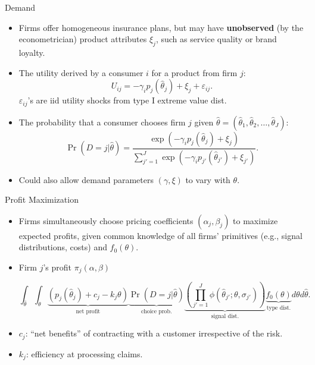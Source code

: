 \documentclass[10pt,aspectratio=169]{beamer}
\begin{document}
\begin{frame}{Demand}
    \begin{itemize}
        \item Firms offer homogeneous insurance plans, but may have \textbf{unobserved} (by the econometrician) product attributes $\xi_j$, such as service quality or brand loyalty.
        
        \medskip
        \item The utility derived by a consumer $i$ for a product from firm $j$:
        \[ U_{ij} = -\gamma_i p_j(\hat{\theta}_j) + \xi_j + \varepsilon_{ij}. \]
        $\varepsilon_{ij}$'s are iid utility shocks from type I extreme value dist.
        
        \medskip
        \item The probability that a consumer chooses firm $j$ given $\hat{\theta} = (\hat{\theta}_1, \hat{\theta}_2, \dots, \hat{\theta}_J)$:
        \[ \Pr(D=j|\hat{\theta}) = \frac{\exp(-\gamma_i p_j(\hat{\theta}_j) + \xi_j)}{\sum_{j'=1}^{J} \exp(-\gamma_i p_{j'}(\hat{\theta}_{j'}) + \xi_{j'})}. \]
        
        \medskip
        \item Could also allow demand parameters $(\gamma, \xi)$ to vary with $\theta$.
    \end{itemize}
\end{frame}

\begin{frame}{Profit Maximization}
    \begin{itemize}
        \item Firms simultaneously choose pricing coefficients $(\alpha_j, \beta_j)$ to maximize expected profits, given common knowledge of all firms' primitives (e.g., signal distributions, costs) and $f_0(\theta)$.
        
        \medskip
        \item Firm $j$'s profit $\pi_j(\alpha, \beta)$
        
        \[
        \int_{\hat{\theta}} \int_{\theta} \underbrace{(p_j(\hat{\theta}_j) + c_j - k_j\theta)}_{\text{net profit}} \underbrace{\Pr(D=j|\hat{\theta})}_{\text{choice prob.}} \underbrace{\left(\prod_{j'=1}^{J} \phi(\hat{\theta}_{j'}; \theta, \sigma_{j'}) \right)}_{\text{signal dist.}} \underbrace{f_0(\theta)}_{\text{type dist.}} d\theta d\hat{\theta}.
        \]
        
        \medskip
        \item $c_j$: ``net benefits'' of contracting with a customer irrespective of the risk.
        
        \item $k_j$: efficiency at processing claims.
    \end{itemize}
\end{frame}
\end{document}
